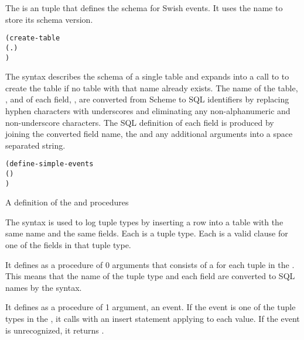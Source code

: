 The  is an  tuple
that defines the schema for Swish events. It uses the name
 to store its schema version.

\begin{syntax}\begin{alltt}
(create-table 
  (  . )
  \etc{})\strut\end{alltt}
\end{syntax}
\expandsto{} 

The  syntax describes the schema of a single
table and expands into a call to  to create the table
if no table with that name already exists. The name of the table,
, and of each field, , are converted from Scheme
to SQL identifiers by replacing hyphen characters with underscores and
eliminating any non-alphanumeric and non-underscore characters. The
SQL definition of each field is produced by joining the converted
field name, the  and any additional  arguments
into a space separated string.

\begin{syntax}\begin{alltt}
(define-simple-events  
  (  \etc{})
  \etc{})\strut\end{alltt}
\end{syntax}
\expandsto{} A definition of the  and 
procedures

The  syntax is used to log tuple types
by inserting a row into a table with the same name and the same
fields. Each  is a tuple type. Each  is a valid
 clause for one of the fields in that tuple
type.

It defines  as a procedure of 0 arguments that consists of
a  for each
tuple in the . This means that the name
of the tuple type and each field are converted to SQL names by the
 syntax.

It defines  as a procedure of 1 argument, an event. If the
event is one of the tuple types in the , it
calls  with an insert statement applying  to
each value. If the event is unrecognized, it returns .

